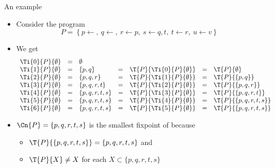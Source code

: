 \begin{frame}{An example}
  \begin{itemize}
  \item Consider the program
    \[
    P
    =
    \left\{
      p \leftarrow ,           \
      q \leftarrow ,           \
      r \leftarrow p,          \
      s \leftarrow q, t,       \
      t \leftarrow r,          \
      u \leftarrow v
    \right\}
    \]
  \item<2-> We get
    \[
    \begin{array}{lclclcl}
      \Ti{0}{P}{\emptyset}&=&\emptyset    &&&&\\
      \Ti{1}{P}{\emptyset}&=&\{p,q\}      &=&\T{P}{\Ti{0}{P}{\emptyset}}&=&\T{P}{\emptyset}\\
      \Ti{2}{P}{\emptyset}&=&\{p,q,r\}    &=&\T{P}{\Ti{1}{P}{\emptyset}}&=&\T{P}{\{p,q\}}\\
      \Ti{3}{P}{\emptyset}&=&\{p,q,r,t\}  &=&\T{P}{\Ti{2}{P}{\emptyset}}&=&\T{P}{\{p,q,r\}}\\
      \Ti{4}{P}{\emptyset}&=&\{p,q,r,t,s\}&=&\T{P}{\Ti{3}{P}{\emptyset}}&=&\T{P}{\{p,q,r,t\}}\\
      \Ti{5}{P}{\emptyset}&=&\{p,q,r,t,s\}&=&\T{P}{\Ti{4}{P}{\emptyset}}&=&\T{P}{\{p,q,r,t,s\}}\\
      \Ti{6}{P}{\emptyset}&=&\{p,q,r,t,s\}&=&\T{P}{\Ti{5}{P}{\emptyset}}&=&\T{P}{\{p,q,r,t,s\}}
    \end{array}
    \]
  \item<3-> $\Cn{P}=\{p,q,r,t,s\}$ is the smallest fixpoint of \Top{P}
    because
    \begin{itemize}
    \item $\T{P}{\{p,q,r,t,s\}}=\{p,q,r,t,s\}$ and
    \item $\T{P}{X}\neq X$ for each $X\subset  \{p,q,r,t,s\}$
    \end{itemize}
  \end{itemize}
\end{frame}
%
